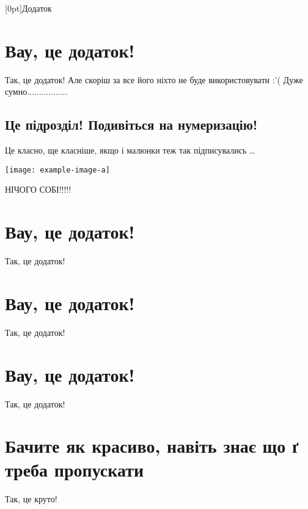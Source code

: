 \documentclass[a4paper, 14pt]{article}
\newlength{\magicspace}\setlength{\magicspace}{2\baselineskip}
\renewenvironment{figure}[1][]{\begin{oldfigure}[#1]\vspace{\magicspace}}{\vspace{\magicspace}\end{oldfigure}}
\begin{document}

[0pt]{\normalfont}{Додаток {\thecontentslabel} }{}{\Dotfill \contentspage} %
\appendix
\setlength{\parindent}{0.5in}

\section{Вау, це додаток!}
Так, це додаток! Але скоріш за все його ніхто не буде використовувати :'( Дуже сумно.................

\subsection{Це підрозділ! Подивіться на нумеризацію!}

Це класно, ще класніше, якщо і малюнки теж так підписувались \ldots

\begin{figure}[h]
    \centering
    \texttt{[image: example-image-a]}
    \caption{І підписується првильно!}
    \label{fig:enter-label}
\end{figure}

НІЧОГО СОБІ!!!!!

\section{Вау, це додаток!}
Так, це додаток!
\section{Вау, це додаток!}
Так, це додаток!
\section{Вау, це додаток!}
Так, це додаток!
\section{Бачите як красиво, навіть знає що ґ треба пропускати}
Так, це круто!

\end{document}
